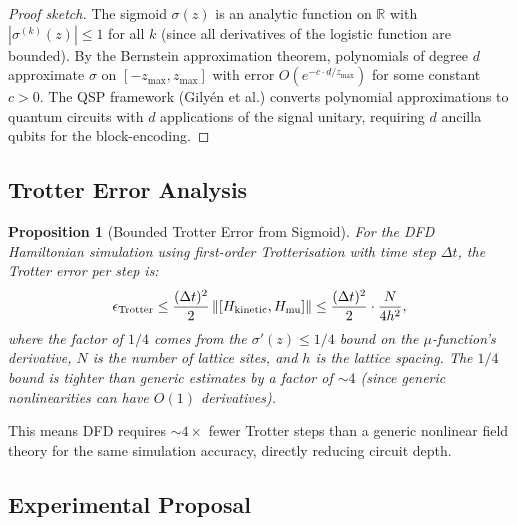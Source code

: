 \documentclass[11pt]{article}
\newtheorem{proposition}[theorem]{Proposition}
\theoremstyle{definition}
\theoremstyle{remark}
\begin{document}
\begin{proof}[Proof sketch]
The sigmoid $\sigma(z)$ is an analytic function on $\mathbb{R}$ with
$|\sigma^{(k)}(z)| \leq 1$ for all $k$ (since all derivatives of the
logistic function are bounded). By the Bernstein approximation theorem,
polynomials of degree $d$ approximate $\sigma$ on $[-z_{\max}, z_{\max}]$
with error $O(e^{-c \cdot d/z_{\max}})$ for some constant $c > 0$. The
QSP framework (Gily\'{e}n et al.) converts polynomial approximations to
quantum circuits with $d$ applications of the signal unitary, requiring
$d$ ancilla qubits for the block-encoding.
\end{proof}

\subsection{Trotter Error Analysis}
\label{sec:trotter-error}

\begin{proposition}[Bounded Trotter Error from Sigmoid]
\label{prop:trotter}
For the DFD Hamiltonian simulation using first-order Trotterisation with
time step $\Delta t$, the Trotter error per step is:
\begin{equation}
  \epsilon_{\rm Trotter} \leq \frac{(\Delta t)^2}{2}
  \left\|\left[H_{\rm kinetic}, H_{\rm mu}\right]\right\|
  \leq \frac{(\Delta t)^2}{2} \cdot \frac{N}{4h^2},
  \label{eq:trotter-bound}
\end{equation}
where the factor of $1/4$ comes from the $\sigma'(z) \leq 1/4$ bound on
the $\mu$-function's derivative, $N$ is the number of lattice sites, and
$h$ is the lattice spacing. The $1/4$ bound is tighter than generic
estimates by a factor of $\sim 4$ (since generic nonlinearities can have
$O(1)$ derivatives).
\end{proposition}

This means DFD requires $\sim 4\times$ fewer Trotter steps than a generic
nonlinear field theory for the same simulation accuracy, directly reducing
circuit depth.

\subsection{Experimental Proposal}
\label{sec:qs-proposal}
\end{document}
